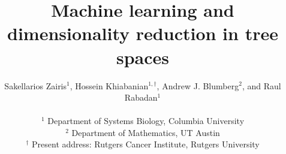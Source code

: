 \documentclass[a4paper,11pt]{article}
\begin{document}
\title{Machine learning and dimensionality reduction in tree spaces}

\author{Sakellarios Zairis$^{1}$, Hossein Khiabanian$^{1,\dagger}$, Andrew J. Blumberg$^{2}$, and Raul Rabadan$^{1}$\\
\\
$^1$ Department of Systems Biology, Columbia University\\
$^2$ Department of Mathematics, UT Austin\\
$^\dagger$ Present address: Rutgers Cancer Institute, Rutgers University\\}
\maketitle


\end{document}
